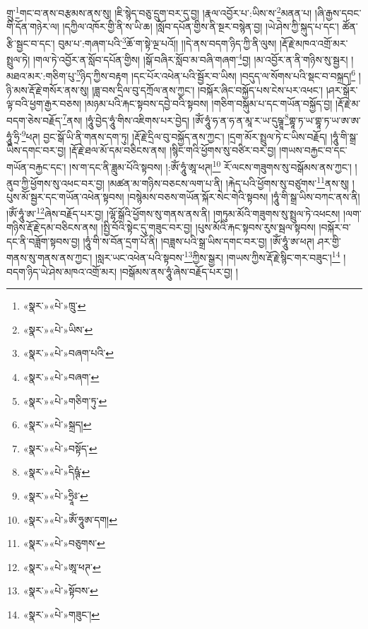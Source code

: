 གྲུ་\footnote{«སྣར་»«པེ་»ཁྲུ་}གང་བ་ནས་བརྩམས་ནས་སུ། །ཇི་སྙེད་བཅུ་དྲུག་བར་དུ་བྱ། །རྣལ་འབྱོར་པ་:ཡིས་ས་\footnote{«སྣར་»«པེ་»ཡིས་}མནན་པ། །ཞི་རྒྱས་དབང་གི་དོན་གཉེར་ལ། །དཀྱིལ་འཁོར་གྱི་ནི་ས་ཡི་ཆ། །སློབ་དཔོན་གྱིས་ནི་སྔར་བསྙེན་བྱ། །ཡེ་ཤེས་ཀྱི་སྐུད་པ་དང་། ཚོན་རྩི་སྦྱང་བ་དང་། བུམ་པ་:གཞག་པའི་\footnote{«སྣར་»«པེ་»བཞག་པའི་}ཆོ་ག་སྟེ་ལྔ་པའོ།། །།དེ་ནས་བདག་ཉིད་ཀྱི་ནི་ལུས། །རྡོ་རྗེ་མཁའ་འགྲོ་མར་སྤྲུལ་ཏེ། །གལ་ཏེ་འབྱོར་ན་སློབ་དཔོན་གྱིས། །སྒོ་བཞིར་སློབ་མ་བཞི་གཞག་\footnote{«སྣར་»«པེ་»བཞག་}བྱ། །མ་འབྱོར་ན་ནི་གཉིས་སུ་སྦྱར། །མཐའ་མར་:གཅིག་པུ་\footnote{«སྣར་»«པེ་»གཅིག་ཏུ་}ཉིད་ཀྱིས་བརྟག །དང་པོར་འཕེན་པའི་སྦྱོར་བ་ཡིས། །བདུད་ལ་སོགས་པའི་སྡང་བ་བསྐྲད།\footnote{«སྣར་»«པེ་»སྐྲད།} །ཉི་མས་རྡོ་རྗེ་གསོར་ནས་སུ། །ཟླ་བས་དྲིལ་བུ་དཀྲོལ་ནས་ཀྱང་། །བསྐོར་ཞིང་བསྐྱོད་པས་ངེས་པར་འཕང་། །ཤར་སྒོར་ལྟ་བའི་ཕྱག་རྒྱར་བཅས། །མཉམ་པའི་རྐང་སྟབས་དབྱེ་བའི་སྟབས། །གཅིག་བསྐུམ་པ་དང་གཡོན་བསྐྱོད་བྱ། །རྡོ་རྗེ་མ་བདག་ཅེས་བརྗོད་\footnote{«སྣར་»«པེ་»བསྟོད་}ནས། །ཧཱུཾ་བྱེད་ཧཱུཾ་གིས་འཇིགས་པར་བྱེད། །ཨོཾ་ཧཱུཾ་ཧ་ན་ཧ་ན་མཱ་ར་ཡ་དུཥྚཱ་\footnote{«སྣར་»«པེ་»དིཥྚཾ་}གྷཱ་ཏ་ཡ་གྷཱ་ཏ་ཡ་ཨ་ཨ་ཧཱུཾ་ཧྲི་\footnote{«སྣར་»«པེ་»ཧྲཱིཿ་}ཕཊ། བྱང་སྒོ་ཡི་ནི་གནས་དག་ཏུ། །རྡོ་རྗེ་དྲིལ་བུ་བསྐྱོད་ནས་ཀྱང་། །དྲག་མོར་སྤྲུལ་ཏེ་ང་ཡིས་བརྗོད། །ཧཱུཾ་གི་སྒྲ་ཡིས་དགང་བར་བྱ། །རྡོ་རྗེ་ཐལ་མོ་དམ་བཅིངས་ནས། །སྙིང་གའི་ཕྱོགས་སུ་བཙིར་བར་བྱ། །གཡས་བརྐྱང་བ་དང་གཡོན་བརྐྱང་དང་། །ས་ག་དང་ནི་ཟླུམ་པོའི་སྟབས། །:ཨོཾ་ཧཱུཾ་ཨཱ་ཕཊ།\footnote{«སྣར་»«པེ་»ཨོཾ་ཧཱུཨ་དག།} རོ་ལངས་གཟུགས་སུ་བསྒོམས་ནས་ཀྱང་། །ནུབ་ཀྱི་ཕྱོགས་སུ་འཕང་བར་བྱ། །མཚན་མ་གཉིས་བཅངས་ལག་པ་ནི། །རྐེད་པའི་ཕྱོགས་སུ་བཙུགས་\footnote{«སྣར་»«པེ་»བཅུགས་}ནས་སུ། །པུས་མོ་སྦྱར་དང་གཡོན་འཕེན་སྟབས། །བསྙེམས་བཅས་གཡོན་སྐོར་སེང་གེའི་སྟབས། །ཧཱུཾ་གི་སྒྲ་ཡིས་བཀང་ནས་ནི། །ཨོཾ་ཧཱུཾ་ཨ་\footnote{«སྣར་»«པེ་»ཨཱ་ཕཊ་}ཞེས་བརྗོད་པར་བྱ། །ལྷོ་སྒོའི་ཕྱོགས་སུ་གནས་ནས་ནི། །གཏུམ་མོའི་གཟུགས་སུ་སྤྲུལ་ཏེ་འཕངས། །ལག་གཉིས་རྡོ་རྗེ་དམ་བཅིངས་ནས། །སྤྱི་བོའི་སྟེང་དུ་གཟུང་བར་བྱ། །པུས་མོའི་རྐང་སྟབས་རུས་སྦལ་སྟབས། །བསྐོར་བ་དང་ནི་བཟློག་སྟབས་བྱ། །ཧཱུཾ་གི་ས་བོན་དྲག་པོ་ནི། །བཟླས་པའི་སྒྲ་ཡིས་དགང་བར་བྱ། །ཨོཾ་ཧཱུཾ་ཨ་ཕཊ། ཤར་གྱི་གནས་སུ་གནས་ནས་ཀྱང་། །སླར་ཡང་འཕེན་པའི་སྟབས་\footnote{«སྣར་»«པེ་»སྟོབས་}ཀྱིས་སྒྱར། །གཡས་ཀྱིས་རྡོ་རྗེ་སྙིང་གར་བཟུང་།\footnote{«སྣར་»«པེ་»གཟུང་།} །བདག་ཉིད་ཡེ་ཤེས་མཁའ་འགྲོ་མར། །བསྒོམས་ནས་ཧཱུཾ་ཞེས་བརྗོད་པར་བྱ། །

